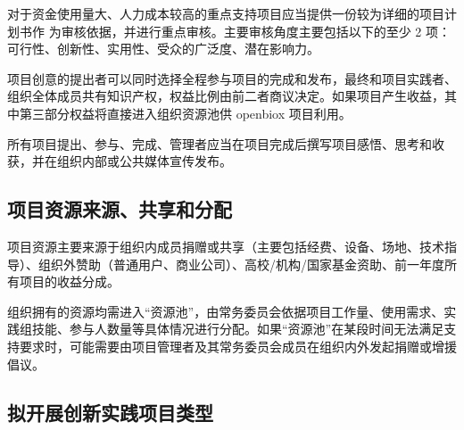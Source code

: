 \documentclass[]{article}
\begin{document}
对于资金使用量大、人力成本较高的重点支持项目应当提供一份较为详细的项目计划书作
为审核依据，并进行重点审核。主要审核角度主要包括以下的至少 2
项：可行性、创新性、实用性、受众的广泛度、潜在影响力。

项目创意的提出者可以同时选择全程参与项目的完成和发布，最终和项目实践者、组织全体成员共有知识产权，权益比例由前二者商议决定。如果项目产生收益，其中第三部分权益将直接进入组织资源池供
openbiox 项目利用。

所有项目提出、参与、完成、管理者应当在项目完成后撰写项目感悟、思考和收获，并在组织内部或公共媒体宣传发布。

\subsection{项目资源来源、共享和分配}

项目资源主要来源于组织内成员捐赠或共享（主要包括经费、设备、场地、技术指导）、组织外赞助（普通用户、商业公司）、高校/机构/国家基金资助、前一年度所有项目的收益分成。

组织拥有的资源均需进入``资源池''，由常务委员会依据项目工作量、使用需求、实践组技能、参与人数量等具体情况进行分配。如果``资源池''在某段时间无法满足支持要求时，可能需要由项目管理者及其常务委员会成员在组织内外发起捐赠或增援倡议。

\subsection{拟开展创新实践项目类型}
\end{document}
